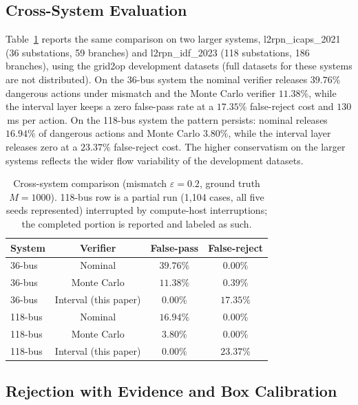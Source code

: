 \documentclass[11pt,a4paper]{article}
\begin{document}
\subsection{Cross-System Evaluation}
\label{sec:rescross}

Table~\ref{tab:cross} reports the same comparison on two larger systems,
l2rpn\_icaps\_2021 (36 substations, 59 branches) and l2rpn\_idf\_2023
(118 substations, 186 branches), using the grid2op development datasets (full
datasets for these systems are not distributed). On the 36-bus system the
nominal verifier releases $39.76\%$ dangerous actions under mismatch and the
Monte Carlo verifier $11.38\%$, while the interval layer keeps a zero
false-pass rate at a $17.35\%$ false-reject cost and $130$\,ms per action. On
the 118-bus system the pattern persists: nominal releases $16.94\%$ of
dangerous actions and Monte Carlo $3.80\%$, while the interval layer releases
zero at a $23.37\%$ false-reject cost. The higher conservatism on the larger
systems reflects the wider flow variability of the development datasets.

\begin{table}[t]
\centering
\caption{Cross-system comparison (mismatch $\varepsilon=0.2$, ground truth
$M=1000$). 118-bus row is a partial run (1{,}104 cases, all five seeds
represented) interrupted by compute-host interruptions; the completed portion
is reported and labeled as such.}
\label{tab:cross}
\begin{tabular}{lccc}
\toprule
System & Verifier & False-pass & False-reject \\
\midrule
36-bus & Nominal & $39.76\%$ & $0.00\%$ \\
36-bus & Monte Carlo & $11.38\%$ & $0.39\%$ \\
36-bus & Interval (this paper) & $\mathbf{0.00\%}$ & $17.35\%$ \\
118-bus & Nominal & $16.94\%$ & $0.00\%$ \\
118-bus & Monte Carlo & $3.80\%$ & $0.00\%$ \\
118-bus & Interval (this paper) & $\mathbf{0.00\%}$ & $23.37\%$ \\
\bottomrule
\end{tabular}
\end{table}

\subsection{Rejection with Evidence and Box Calibration}
\label{sec:reswitness}
\end{document}
